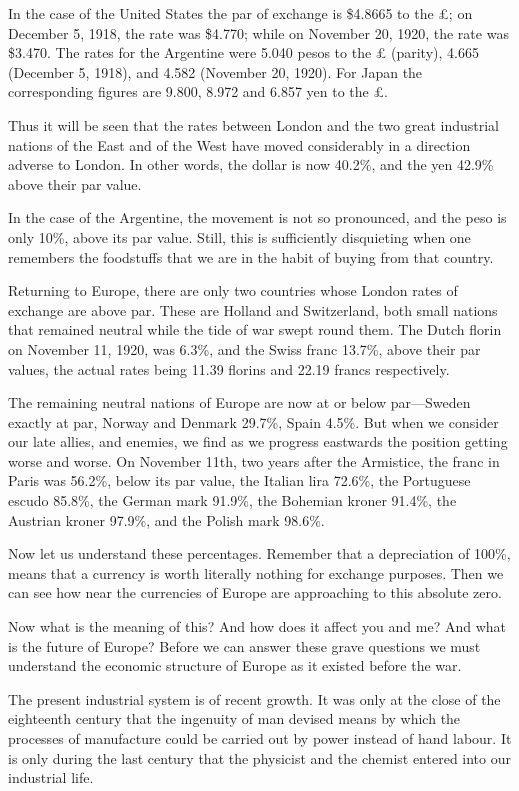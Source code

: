 \documentclass{book}
\begin{document}
In the case of the United States the par of exchange is \$4.8665 to the £; on December 5, 1918, the rate was \$4.770; while on November 20, 1920, the rate was \$3.470. The rates for the Argentine were 5.040 pesos to the £ (parity), 4.665 (December 5, 1918), and 4.582 (November 20, 1920). For Japan the corresponding figures are 9.800, 8.972 and 6.857 yen to the £.

Thus it will be seen that the rates between London and the two great industrial nations of the East and of the West have moved considerably in a direction adverse to London. In other words, the dollar is now 40.2\%, and the yen 42.9\% above their par value.

In the case of the Argentine, the movement is not so pronounced, and the peso is only 10\%, above its par value. Still, this is sufficiently disquieting when one remembers the foodstuffs that we are in the habit of buying from that country.

Returning to Europe, there are only two countries whose London rates of exchange are above par. These are Holland and Switzerland, both small nations that remained neutral while the tide of war swept round them. The Dutch florin on November 11, 1920, was 6.3\%, and the Swiss franc 13.7\%, above their par values, the actual rates being 11.39 florins and 22.19 francs respectively.

The remaining neutral nations of Europe are now at or below par—Sweden exactly at par, Norway and Denmark 29.7\%, Spain 4.5\%. But when we consider our late allies, and enemies, we find as we progress eastwards the position getting worse and worse. On November 11th, two years after the Armistice, the franc in Paris was 56.2\%, below its par value, the Italian lira 72.6\%, the Portuguese escudo 85.8\%, the German mark 91.9\%, the Bohemian kroner 91.4\%, the Austrian kroner 97.9\%, and the Polish mark 98.6\%.

Now let us understand these percentages. Remember that a depreciation of 100\%, means that a currency is worth literally nothing for exchange purposes. Then we can see how near the currencies of Europe are approaching to this absolute zero.

Now what is the meaning of this? And how does it affect you and me? And what is the future of Europe? Before we can answer these grave questions we must understand the economic structure of Europe as it existed before the war.

The present industrial system is of recent growth. It was only at the close of the eighteenth century that the ingenuity of man devised means by which the processes of manufacture could be carried out by power instead of hand labour. It is only during the last century that the physicist and the chemist entered into our industrial life.
\end{document}

